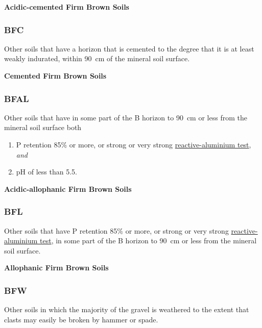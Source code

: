 \documentclass[
  letterpaper,
  DIV=11,
  numbers=noendperiod]{scrreprt}
\providecommand{\tightlist}{%
  \setlength{\itemsep}{0pt}\setlength{\parskip}{0pt}}\usepackage{longtable,booktabs,array}
\begin{document}
\textbf{Acidic-cemented Firm Brown Soils}

\hypertarget{sec-key-BFC}{%
\subsubsection{\texorpdfstring{\textbf{BFC}}{BFC}}\label{sec-key-BFC}}

Other soils that have a horizon that is cemented to the degree that it
is at least weakly indurated, within 90~cm of the mineral soil surface.

\textbf{Cemented Firm Brown Soils}

\hypertarget{sec-key-BFAL}{%
\subsubsection{\texorpdfstring{\textbf{BFAL}}{BFAL}}\label{sec-key-BFAL}}

Other soils that have in some part of the B horizon to 90~cm or less
from the mineral soil surface both

\begin{enumerate}
\def\labelenumi{\arabic{enumi}.}
\tightlist
\item
  P retention 85\% or more, or strong or very strong
  \protect\hyperlink{sec-diag-naf}{reactive-aluminium test}, \emph{and}
\item
  pH of less than 5.5.
\end{enumerate}

\textbf{Acidic-allophanic Firm Brown Soils}

\hypertarget{sec-key-BFL}{%
\subsubsection{\texorpdfstring{\textbf{BFL}}{BFL}}\label{sec-key-BFL}}

Other soils that have P retention 85\% or more, or strong or very strong
\protect\hyperlink{sec-diag-naf}{reactive-aluminium test}, in some part
of the B horizon to 90~cm or less from the mineral soil surface.

\textbf{Allophanic Firm Brown Soils}

\hypertarget{sec-key-BFW}{%
\subsubsection{\texorpdfstring{\textbf{BFW}}{BFW}}\label{sec-key-BFW}}

Other soils in which the majority of the gravel is weathered to the
extent that clasts may easily be broken by hammer or spade.
\end{document}
